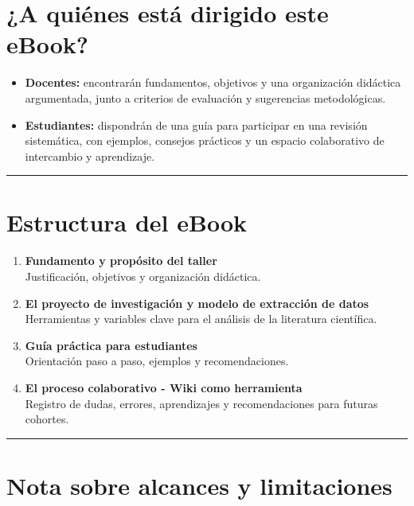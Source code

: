 \documentclass[
  letterpaper,
]{book}
\providecommand{\tightlist}{%
  \setlength{\itemsep}{0pt}\setlength{\parskip}{0pt}}\usepackage{longtable,booktabs,array}
\begin{document}
\section{¿A quiénes está dirigido este
eBook?}\label{a-quiuxe9nes-estuxe1-dirigido-este-ebook}

\begin{itemize}
\tightlist
\item
  \textbf{Docentes:} encontrarán fundamentos, objetivos y una
  organización didáctica argumentada, junto a criterios de evaluación y
  sugerencias metodológicas.
\item
  \textbf{Estudiantes:} dispondrán de una guía para participar en una
  revisión sistemática, con ejemplos, consejos prácticos y un espacio
  colaborativo de intercambio y aprendizaje.
\end{itemize}

\begin{center}\rule{0.5\linewidth}{0.5pt}\end{center}

\section{Estructura del eBook}\label{estructura-del-ebook}

\begin{enumerate}
\def\labelenumi{\arabic{enumi}.}
\tightlist
\item
  \textbf{Fundamento y propósito del taller}\\
  Justificación, objetivos y organización didáctica.
\item
  \textbf{El proyecto de investigación y modelo de extracción de
  datos}\\
  Herramientas y variables clave para el análisis de la literatura
  científica.
\item
  \textbf{Guía práctica para estudiantes}\\
  Orientación paso a paso, ejemplos y recomendaciones.
\item
  \textbf{El proceso colaborativo - Wiki como herramienta}\\
  Registro de dudas, errores, aprendizajes y recomendaciones para
  futuras cohortes.
\end{enumerate}

\begin{center}\rule{0.5\linewidth}{0.5pt}\end{center}

\section{Nota sobre alcances y
limitaciones}\label{nota-sobre-alcances-y-limitaciones}
\end{document}
